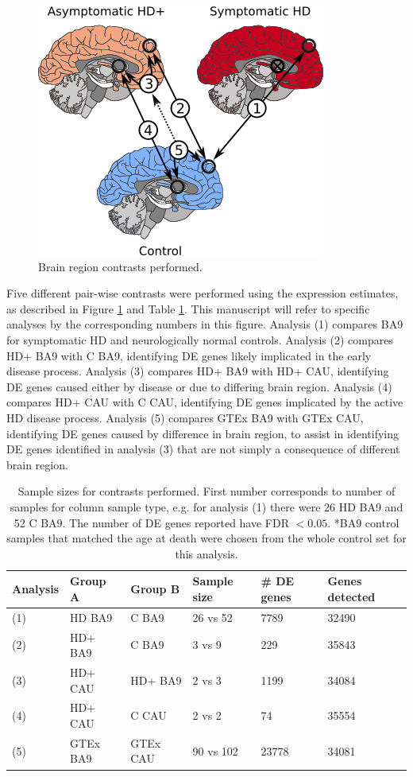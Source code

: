 \documentclass[fleqn,10pt,table]{wlscirep}
\begin{document}
\begin{figure}[ht]
\centering
\includegraphics[width=0.5\linewidth]{asymp_figure_1.png}
\caption{Brain region contrasts performed. \label{fig:contrasts}}
\end{figure}

Five different pair-wise contrasts were performed using the expression estimates, as described in Figure \ref{fig:contrasts} and Table \ref{tab:contrasts}.
This manuscript will refer to specific analyses by the corresponding numbers in this figure.
Analysis (1) compares BA9 for symptomatic HD and neurologically normal controls.
Analysis (2) compares HD+ BA9 with C BA9, identifying DE genes likely implicated in the early disease process.
Analysis (3) compares HD+ BA9 with HD+ CAU, identifying DE genes caused either by disease or due to differing brain region.
Analysis (4) compares HD+ CAU with C CAU, identifying DE genes implicated by the active HD disease process.
Analysis (5) compares GTEx BA9 with GTEx CAU, identifying DE genes caused by difference in brain region, to assist in identifying DE genes identified in analysis (3) that are not simply a consequence of different brain region.

\begin{table}[ht]
\centering
{}
\begin{tabular}{|l|l|l|l|l|l|} \hline
Analysis & Group A & Group B & Sample size & \# DE genes & Genes detected \\ \hline
(1) & HD BA9 & C BA9 & 26 vs 52 & 7789 & 32490 \\ \hline
(2) & HD+ BA9 & C BA9 & 3 vs 9 & 229 & 35843 \\ \hline
(3) & HD+ CAU & HD+ BA9 & 2 vs 3 & 1199 & 34084 \\ \hline
(4) & HD+ CAU & C CAU & 2 vs 2 & 74 & 35554 \\ \hline
(5) & GTEx BA9 & GTEx CAU & 90 vs 102 & 23778 & 34081 \\ \hline
\end{tabular}
\caption{
Sample sizes for contrasts performed.
First number corresponds to number of samples for column sample type, e.g. for analysis (1) there were 26 HD BA9 and 52 C BA9.
The number of DE genes reported have FDR $< 0.05$.
*BA9 control samples that matched the age at death were chosen from the whole control set for this analysis.
\label{tab:contrasts}}
\end{table}
\end{document}
